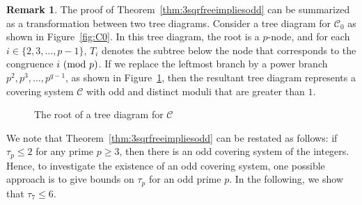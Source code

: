\documentclass[12pt]{article}
\theoremstyle{definition}
\newtheorem{remark}[theorem]{Remark}
\renewcommand{\i}{\textup{\textbf{i}}}
\renewcommand{\j}{\textup{\textbf{j}}}
\renewcommand{\mod}[2]{#1\textup{ (mod }#2\textup{)}}
\begin{document}
\begin{remark}
The proof of Theorem~\ref{thm:3sqrfreeimpliesodd} can be summarized as a transformation between two tree diagrams. Consider a tree diagram for $\mathcal{C}_0$ as shown in Figure~\ref{fig:C0}. In this tree diagram, the root is a $p$-node, and for each $i\in\{2,3,\dotsc,p-1\}$, $T_i$ denotes the subtree below the node that corresponds to the congruence $\mod{i}{p}$. If we replace the leftmost branch by a power branch $p^2,p^3,\dotsc,p^{q-1}$, as shown in Figure~\ref{fig:C}, then the resultant tree diagram represents a covering system $\mathcal{C}$ with odd and distinct moduli that are greater than $1$.
\begin{figure}[H]
\centering
\begin{minipage}{0.48\textwidth}
\centering
{}
\caption{The root of a tree diagram for $\mathcal{C}_0$}
\label{fig:C0}
\end{minipage}
\begin{minipage}{0.48\textwidth}
\centering
{}
\caption{The root of a tree diagram for $\mathcal{C}$}
\label{fig:C}
\end{minipage}
\end{figure}
\end{remark}


We note that Theorem~\ref{thm:3sqrfreeimpliesodd} can be restated as follows: if $\tau_p\leq2$ for any prime $p\geq3$, then there is an odd covering system of the integers. Hence, to investigate the existence of an odd covering system, one possible approach is to give bounds on $\tau_p$ for an odd prime $p$. In the following, we show that $\tau_7\leq6$.
\end{document}
